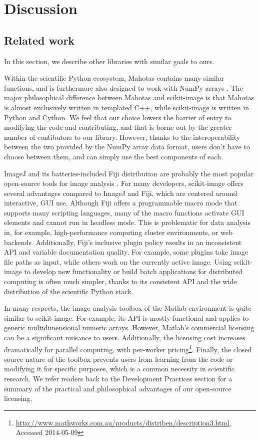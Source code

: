 
\section*{Discussion}
  \label{sec:discussion}

  \subsection*{Related work}

  In this section, we describe other libraries with similar goals to ours.
  
  Within the scientific Python ecosystem, Mahotas contains many similar
  functions, and is furthermore also designed to work with NumPy arrays
  \citep{Mahotas}. The major philosophical difference between Mahotas and
  scikit-image is that Mahotas is almost exclusively written in templated C++,
  while scikit-image is written in Python and Cython. We feel that our choice
  lowers the barrier of entry to modifying the code and contributing, and that
  is borne out by the greater number of contibutors to our library. However,
  thanks to the interoperability between the two provided by the NumPy array
  data format, users don't have to choose between them, and can simply use the
  best components of each.

  ImageJ and its batteries-included Fiji distribution are probably the most
  popular open-source tools for image analysis \citep{imagej,Fiji}. For many
  developers, scikit-image offers several advantages compared to ImageJ and 
  Fiji, which are centered around interactive, GUI use. Although Fiji offers a
  programmable macro mode that supports many scripting languages, many of the
  macro functions activate GUI elements and cannot run in headless mode. This
  is problematic for data analysis in, for example, high-performance computing
  cluster environments, or web backends. Additionally, Fiji's inclusive plugin
  policy results in an inconsistent API and variable documentation quality. For example,
  some plugins take image file paths as input, while others work on the
  currently active image. Using scikit-image to develop new functionality or
  build batch applications for distributed computing is often much simpler,
  thanks to its consistent API and the wide distribution of the scientific
  Python stack.

  In many respects, the image analysis toolbox of the Matlab environment is
  quite similar to scikit-image. For example, its API is mostly functional and
  applies to generic multidimensional numeric arrays. However, Matlab's
  commercial licensing can be a significant nuisance to users. Additionally,
  the licensing cost increases dramatically for parallel computing, with
  per-worker pricing\footnote{\url{http://www.mathworks.com.au/products/distriben/description3.html}, Accessed 2014-05-09}.
  Finally, the closed source nature of the toolbox prevents users from
  learning from the code or modifying it for specific purposes, which is a
  common necessity in scientific research. We refer readers back to the
  Development Practices section for a summary of the practical and
  philosophical advantages of our open-source licensing.

